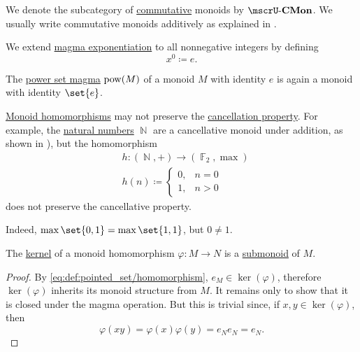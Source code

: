 \begin{definition}
\begin{thmenum}
    We denote the subcategory of \hyperref[def:magma/commutative]{commutative} monoids by \( \ucat{CMon} \). We usually write commutative monoids additively as explained in .

     We extend \hyperref[def:magma/exponentiation]{magma exponentiation} to all nonnegative integers by defining
    \begin{equation*}
      x^0 \coloneqq e.
    \end{equation*}

     The \hyperref[def:magma/power_set]{power set magma} \( \operatorname{pow}(M) \) of a monoid \( M \) with identity \( e \) is again a monoid with identity \( \set{ e } \).
  \end{thmenum}
\end{definition}

\begin{example}\label{ex:monoid_cancellation_not_preserved_by_homomorphism}
  \hyperref[def:monoid/homomorphism]{Monoid homomorphisms} may not preserve the \hyperref[def:magma/cancellative]{cancellation property}. For example, the \hyperref[def:set_of_natural_numbers]{natural numbers} \( \BbbN \) are a cancellative monoid under addition, as shown in ), but the homomorphism
  \begin{equation*}
    \begin{aligned}
      &h: (\BbbN, +) \to (\hyperref[thm:galois_field_existence]{\BbbF_2}, \max) \\
      &h(n) \coloneqq \begin{cases}
        0, &n = 0 \\
        1, &n > 0
      \end{cases}
    \end{aligned}
  \end{equation*}
  does not preserve the cancellative property.

  Indeed, \( \max\set{ 0, 1 } = \max\set{ 1, 1 } \), but \( 0 \neq 1 \).
\end{example}

\begin{proposition}\label{thm:monoid_kernel_is_submagma}
  The \hyperref[def:pointed_set_kernel]{kernel} of a monoid homomorphism \( \varphi: M \to N \) is a \hyperref[def:first_order_substructure]{submonoid} of \( M \).
\end{proposition}
\begin{proof}
  By \eqref{eq:def:pointed_set/homomorphism}, \( e_{M} \in \ker(\varphi) \), therefore \( \ker(\varphi) \) inherits its monoid structure from \( M \). It remains only to show that it is closed under the magma operation. But this is trivial since, if \( x, y \in \ker(\varphi) \), then
  \begin{equation*}
    \varphi(xy) = \varphi(x) \varphi(y) = e_{N} e_{N} = e_{N}.
  \end{equation*}
\end{proof}

